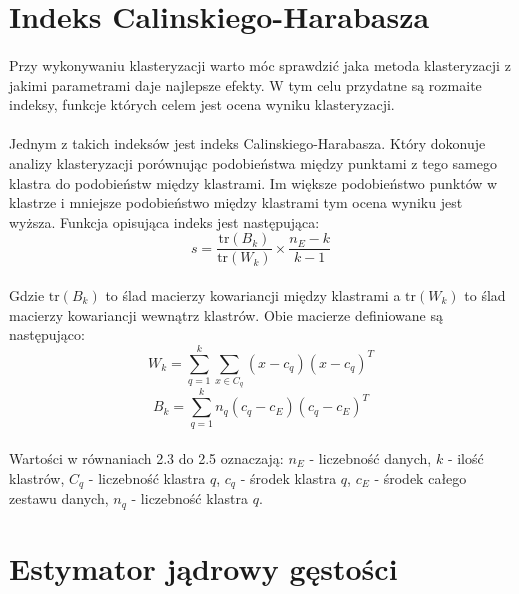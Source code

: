 \section{Indeks Calinskiego-Harabasza}
\paragraph{}
Przy wykonywaniu klasteryzacji warto móc sprawdzić jaka metoda klasteryzacji z jakimi parametrami daje najlepsze efekty. W tym celu przydatne są rozmaite indeksy, funkcje których celem jest ocena wyniku klasteryzacji. 
\paragraph{}
Jednym z takich indeksów jest indeks Calinskiego-Harabasza. Który dokonuje analizy klasteryzacji porównując podobieństwa między punktami z tego samego klastra do podobieństw między klastrami. Im większe podobieństwo punktów w klastrze i mniejsze podobieństwo między klastrami tym ocena wyniku jest wyższa. Funkcja opisująca indeks jest następująca:
\begin{equation}
	s = \frac{\mathrm{tr}(B_k)}{\mathrm{tr}(W_k)} \times \frac{n_E - k}{k - 1}
\end{equation}
\paragraph{}
Gdzie $\mathrm{tr}(B_k)$ to ślad macierzy kowariancji między klastrami a $\mathrm{tr}(W_k)$ to ślad macierzy kowariancji wewnątrz klastrów. Obie macierze definiowane są następująco:
\begin{equation}
	W_k = \sum_{q=1}^k \sum_{x \in C_q} (x - c_q) (x - c_q)^T
\end{equation}
\begin{equation}
	B_k = \sum_{q=1}^k n_q (c_q - c_E) (c_q - c_E)^T
\end{equation}
\paragraph{}
Wartości w równaniach 2.3 do 2.5 oznaczają: $n_E$ - liczebność danych, $k$ - ilość klastrów, $C_q$ - liczebność klastra $q$, $c_q$ - środek klastra $q$, $c_E$ - środek całego zestawu danych, $n_q$ - liczebność klastra $q$.
\section{Estymator jądrowy gęstości}
